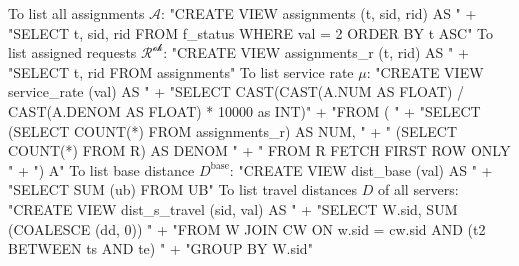 To list all assignments $\mathcal{A}$:
\nwenddocs{}\endmoddef{}
"CREATE VIEW assignments (t, sid, rid) AS "
  + "SELECT t, sid, rid FROM f_status WHERE val = 2 ORDER BY t ASC"
\nwendcode{}\nwdocspar
To list assigned requests $\mathcal{R^\textrm{ok}}$:
\nwenddocs{}\endmoddef{}
"CREATE VIEW assignments_r (t, rid) AS "
  + "SELECT t, rid FROM assignments"
\nwendcode{}\nwdocspar
To list service rate $\mu$:
\nwenddocs{}\endmoddef{}
"CREATE VIEW service_rate (val) AS "
  + "SELECT CAST(CAST(A.NUM AS FLOAT) / CAST(A.DENOM AS FLOAT) * 10000 as INT)"
  + "FROM ( "
  + "SELECT (SELECT COUNT(*) FROM assignments_r) AS NUM, "
  + "       (SELECT COUNT(*) FROM R) AS DENOM "
  + "       FROM R FETCH FIRST ROW ONLY "
  + ") A"
\nwendcode{}\nwdocspar
To list base distance $D^\textrm{base}$:
\nwenddocs{}\endmoddef{}
"CREATE VIEW dist_base (val) AS "
  + "SELECT SUM (ub) FROM UB"
\nwendcode{}\nwdocspar
To list travel distances $D$ of all servers:
\nwenddocs{}\endmoddef{}
"CREATE VIEW dist_s_travel (sid, val) AS "
  + "SELECT W.sid, SUM (COALESCE (dd, 0)) "
  + "FROM W JOIN CW ON w.sid = cw.sid AND (t2 BETWEEN ts AND te) "
  + "GROUP BY W.sid"
